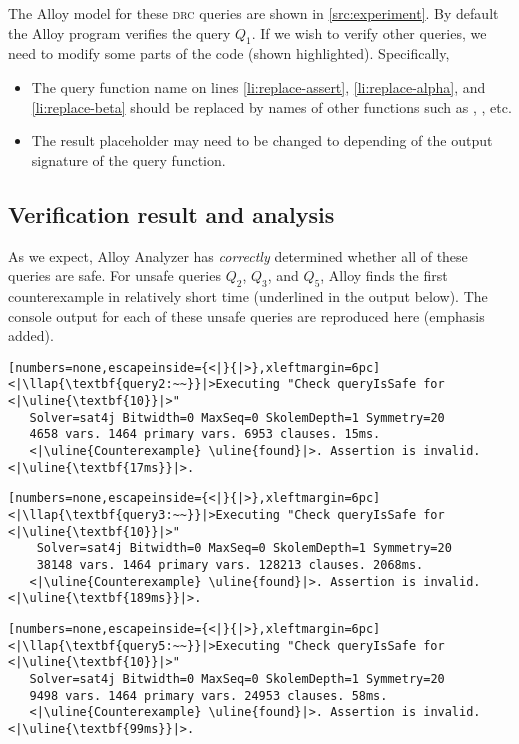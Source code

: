 \bigskip
{}
The Alloy model for these \textsc{drc} queries are shown in \autoref{src:experiment}. By default the Alloy program verifies the query $Q_1$. If we wish to verify other queries, we need to modify some parts of the code (shown highlighted). Specifically,
\begin{itemize}[topsep=0.5pc,itemsep=0.25pc]
    \item  The query function name  on lines \ref{li:replace-assert}, \ref{li:replace-alpha}, and \ref{li:replace-beta} should be replaced by names of other functions such as , , etc.
    \item  The result placeholder  may need to be changed to  depending of the output signature of the query function.
\end{itemize}

\subsection{Verification result and analysis}

As we expect, Alloy Analyzer has \emph{correctly} determined whether all of these queries are safe. For unsafe queries $Q_2$, $Q_3$, and $Q_5$, Alloy finds the first counterexample in relatively short time (underlined in the output below). The console output for each of these unsafe queries are reproduced here (emphasis added).

\begin{lstlisting}[numbers=none,escapeinside={<|}{|>},xleftmargin=6pc]
<|\llap{\textbf{query2:~~}}|>Executing "Check queryIsSafe for <|\uline{\textbf{10}}|>"
   Solver=sat4j Bitwidth=0 MaxSeq=0 SkolemDepth=1 Symmetry=20
   4658 vars. 1464 primary vars. 6953 clauses. 15ms.
   <|\uline{Counterexample} \uline{found}|>. Assertion is invalid. <|\uline{\textbf{17ms}}|>.
\end{lstlisting}

\begin{lstlisting}[numbers=none,escapeinside={<|}{|>},xleftmargin=6pc]
<|\llap{\textbf{query3:~~}}|>Executing "Check queryIsSafe for <|\uline{\textbf{10}}|>"
    Solver=sat4j Bitwidth=0 MaxSeq=0 SkolemDepth=1 Symmetry=20
    38148 vars. 1464 primary vars. 128213 clauses. 2068ms.
   <|\uline{Counterexample} \uline{found}|>. Assertion is invalid. <|\uline{\textbf{189ms}}|>.
\end{lstlisting}

\newpage
\begin{lstlisting}[numbers=none,escapeinside={<|}{|>},xleftmargin=6pc]
<|\llap{\textbf{query5:~~}}|>Executing "Check queryIsSafe for <|\uline{\textbf{10}}|>"
   Solver=sat4j Bitwidth=0 MaxSeq=0 SkolemDepth=1 Symmetry=20
   9498 vars. 1464 primary vars. 24953 clauses. 58ms.
   <|\uline{Counterexample} \uline{found}|>. Assertion is invalid. <|\uline{\textbf{99ms}}|>.
\end{lstlisting}

